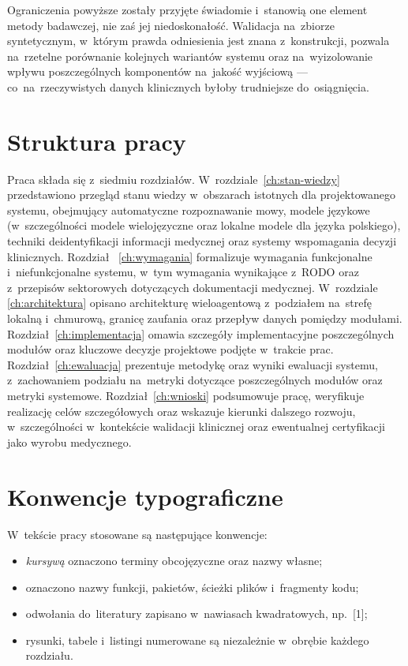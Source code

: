Ograniczenia powyższe zostały przyjęte świadomie i~stanowią one element
metody badawczej, nie zaś jej niedoskonałość. Walidacja na~zbiorze
syntetycznym, w~którym prawda odniesienia jest znana z~konstrukcji,
pozwala na~rzetelne porównanie kolejnych wariantów systemu oraz
na~wyizolowanie wpływu poszczególnych komponentów na~jakość
wyjściową --- co~na~rzeczywistych danych klinicznych byłoby
trudniejsze do~osiągnięcia.

\section{Struktura pracy}\label{sec:struktura}

Praca składa się z~siedmiu rozdziałów. W~rozdziale~\ref{ch:stan-wiedzy}
przedstawiono przegląd stanu wiedzy w~obszarach istotnych dla
projektowanego systemu, obejmujący automatyczne rozpoznawanie mowy,
modele językowe (w~szczególności modele wielojęzyczne oraz lokalne
modele dla języka polskiego), techniki deidentyfikacji informacji
medycznej oraz systemy wspomagania decyzji klinicznych. Rozdział~%
\ref{ch:wymagania} formalizuje wymagania funkcjonalne i~niefunkcjonalne
systemu, w~tym wymagania wynikające z~RODO oraz z~przepisów
sektorowych dotyczących dokumentacji medycznej. W~rozdziale~%
\ref{ch:architektura} opisano architekturę wieloagentową z~podziałem
na~strefę lokalną i~chmurową, granicę zaufania oraz przepływ danych
pomiędzy modułami. Rozdział~\ref{ch:implementacja} omawia szczegóły
implementacyjne poszczególnych modułów oraz kluczowe decyzje
projektowe podjęte w~trakcie prac. Rozdział~\ref{ch:ewaluacja}
prezentuje metodykę oraz wyniki ewaluacji systemu, z~zachowaniem
podziału na~metryki dotyczące poszczególnych modułów oraz metryki
systemowe. Rozdział~\ref{ch:wnioski} podsumowuje pracę, weryfikuje
realizację celów szczegółowych oraz wskazuje kierunki dalszego
rozwoju, w~szczególności w~kontekście walidacji klinicznej oraz
ewentualnej certyfikacji jako wyrobu medycznego.

\section{Konwencje typograficzne}\label{sec:konwencje}

W~tekście pracy stosowane są następujące konwencje:
\begin{itemize}
  \item \emph{kursywą} oznaczono terminy obcojęzyczne oraz nazwy własne;
  \item {} oznaczono nazwy funkcji, pakietów,
        ścieżki plików i~fragmenty kodu;
  \item odwołania do~literatury zapisano w~nawiasach kwadratowych, np.~[1];
  \item rysunki, tabele i~listingi numerowane są niezależnie w~obrębie
        każdego rozdziału.
\end{itemize}
